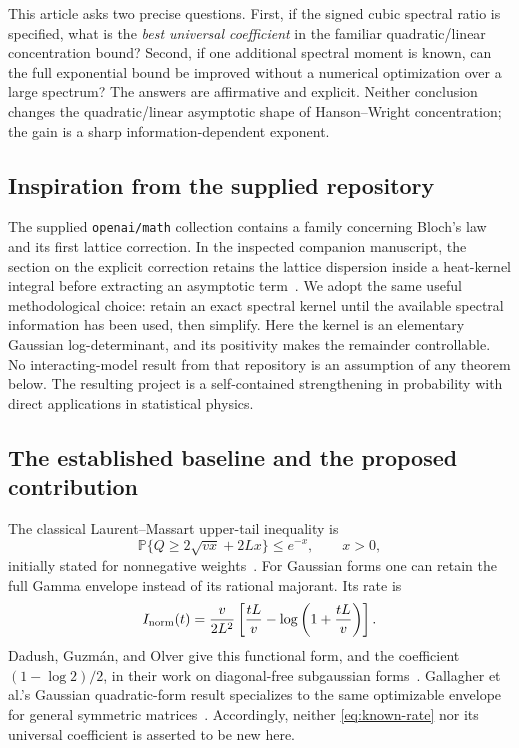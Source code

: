 \documentclass[11pt,letterpaper]{article}
\numberwithin{equation}{section}
\theoremstyle{definition}\newtheorem{definition}[theorem]{Definition}
\theoremstyle{remark}\newtheorem{remark}[theorem]{Remark}
\newcommand{\PP}{\mathbb P}
\begin{document}
This article asks two precise questions. First, if the signed cubic
spectral ratio is specified, what is the \emph{best universal coefficient}
in the familiar quadratic/linear concentration bound? Second, if one
additional spectral moment is known, can the full exponential bound be
improved without a numerical optimization over a large spectrum?
The answers are affirmative and explicit. Neither conclusion changes the
quadratic/linear asymptotic shape of Hanson--Wright concentration; the
gain is a sharp information-dependent exponent.

\subsection{Inspiration from the supplied repository}
The supplied \texttt{openai/math} collection contains a family concerning
Bloch's law and its first lattice correction. In the inspected companion
manuscript, the section on the explicit correction retains the lattice
dispersion inside a heat-kernel integral before extracting an asymptotic
term~\cite{openai,bloch}. We adopt the same useful methodological choice:
retain an exact spectral kernel until the available spectral information
has been used, then simplify. Here the kernel is an elementary Gaussian
log-determinant, and its positivity makes the remainder controllable.
No interacting-model result from that repository is an assumption of any
theorem below. The resulting project is a self-contained strengthening
in probability with direct applications in statistical physics.

\subsection{The established baseline and the proposed contribution}
The classical Laurent--Massart upper-tail inequality is
\begin{equation}\label{eq:LM}
 \PP\{Q\ge 2\sqrt{vx}+2Lx\}\le e^{-x},\qquad x>0,
\end{equation}
initially stated for nonnegative weights~\cite{LM}. For Gaussian forms
one can retain the full Gamma envelope instead of its rational
majorant. Its rate is
\begin{equation}\label{eq:known-rate}
 I_{\rm norm}(t)=\frac{v}{2L^2}
 \left[\frac{tL}{v}-\log\left(1+\frac{tL}{v}\right)\right].
\end{equation}
Dadush, Guzm\'an, and Olver give this functional form, and the coefficient
$(1-\log2)/2$, in their work on diagonal-free subgaussian
forms~\cite[Theorem 3.2 and Section 6]{DGO}. Gallagher et al.'s
Gaussian quadratic-form result specializes to the same optimizable
envelope for general symmetric matrices~\cite{Gallagher}.
Accordingly, neither \eqref{eq:known-rate} nor its universal coefficient
is asserted to be new here.
\end{document}
